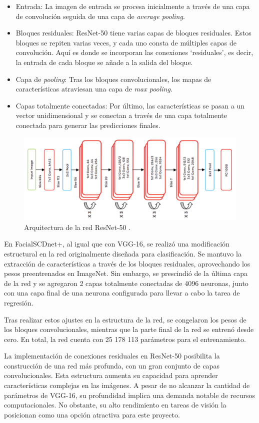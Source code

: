 \begin{itemize}
	\item Entrada: La imagen de entrada se procesa inicialmente a través de una capa de convolución seguida de una capa de \textit{average pooling}.
	\item Bloques residuales: ResNet-50 tiene varias capas de bloques residuales. Estos bloques se repiten varias veces, y cada uno consta de múltiples capas de convolución. Aquí es donde se incorporan las conexiones \enquote*{residuales}, es decir, la entrada de cada bloque se añade a la salida del bloque.
	\item Capa de \textit{pooling}: Tras los bloques convolucionales, los mapas de características atraviesan una capa de \textit{max pooling}.
	\item Capas totalmente conectadas: Por último, las características se pasan a un vector unidimensional y se conectan a través de una capa totalmente conectada para generar las predicciones finales.
\end{itemize}

\begin{figure}[h]
	\centering
	\includegraphics[scale=0.12]{imagenes/cap4/resnet.png}
	\caption[Arquitectura de la red ResNet-50.]{Arquitectura de la red ResNet-50 \cite{73}.}
	\label{fig29}
\end{figure}

En FacialSCDnet+, al igual que con VGG-16, se realizó una modificación estructural en la red originalmente diseñada para clasificación. Se mantuvo la extracción de características a través de los bloques residuales, aprovechando los pesos preentrenados en ImageNet. Sin embargo, se prescindió de la última capa de la red y se agregaron 2 capas totalmente conectadas de 4096 neuronas, junto con una capa final de una neurona configurada para llevar a cabo la tarea de regresión.

Tras realizar estos ajustes en la estructura de la red, se congelaron los pesos de los bloques convolucionales, mientras que la parte final de la red se entrenó desde cero. En total, la red cuenta con 25 178 113 parámetros para el entrenamiento.

La implementación de conexiones residuales en ResNet-50 posibilita la construcción de una red más profunda, con un gran conjunto de capas convolucionales. Esta estructura aumenta su capacidad para aprender características complejas en las imágenes. A pesar de no alcanzar la cantidad de parámetros de VGG-16, su profundidad implica una demanda notable de recursos computacionales. No obstante, su alto rendimiento en tareas de visión la posicionan como una opción atractiva para este proyecto.